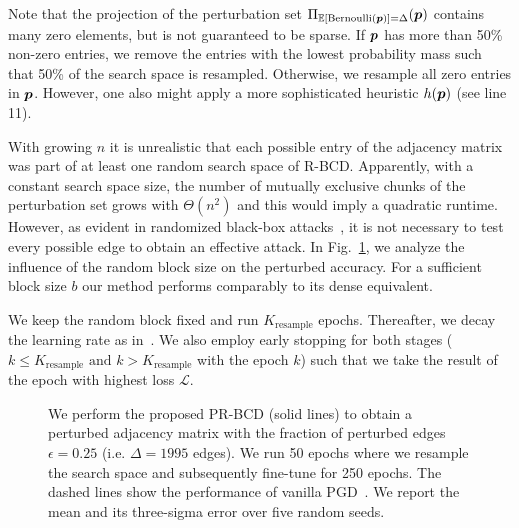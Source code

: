 \documentclass[letterpaper]{article} %
\begin{document}
Note that the projection of the perturbation set \(\Pi_{\mathbb{E}[\text{Bernoulli}({\bm{p}})] = \Delta} ({\bm{p}})\) contains many zero elements, but is not guaranteed to be sparse. If \({\bm{p}}\) has more than 50\% non-zero entries, we remove the entries with the lowest probability mass such that 50\% of the search space is resampled. Otherwise, we resample all zero entries in \({\bm{p}}\). However, one also might apply a more sophisticated heuristic \(h({\bm{p}})\) (see line 11).

With growing \(n\) it is unrealistic that each possible entry of the adjacency matrix was part of at least one random search space of R-BCD. Apparently, with a constant search space size, the number of mutually exclusive chunks of the perturbation set grows with \(\Theta(n^2)\) and this would imply a quadratic runtime. However, as evident in randomized black-box attacks~\citep{Waniek2018}, it is not necessary to test every possible edge to obtain an effective attack. In Fig.~\ref{fig:randomblocksizeinfluence}, we analyze the influence of the random block size on the perturbed accuracy. For a sufficient block size \(b\) our method performs comparably to its dense equivalent.

We keep the random block fixed and run \(K_{\text{resample}}\) epochs. Thereafter, we decay the learning rate as in~\cite{Xu2019a}. We also employ early stopping for both stages (\(k \le K_{\text{resample}} \text{ and } k > K_{\text{resample}}\) with the epoch \(k\)) such that we take the result of the epoch with highest loss \(\mathcal{L}\). 


\begin{figure}[t]
  \centering
  \vspace{-15pt} \resizebox{\linewidth}{!}{}
  \caption{We perform the proposed PR-BCD (solid lines) to obtain a perturbed adjacency matrix with the fraction of perturbed edges \(\epsilon=0.25\) (i.e. \(\Delta=1995\) edges). We run 50 epochs where we resample the search space and subsequently fine-tune for 250 epochs. The dashed lines show the performance of vanilla PGD~\citep{Xu2019a}. We report the mean and its three-sigma error over five random seeds. \label{fig:randomblocksizeinfluence}}
\end{figure}
 
\end{document}
